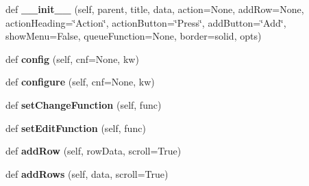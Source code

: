 \begin{DoxyCompactItemize}
\item 
\mbox{\label{class_python_01_g_u_i_1_1appjar_1_1_simple_table_a076b26a3bbfc6f50b1dfe77f1b02a424}} 
def {\bfseries \+\_\+\+\_\+init\+\_\+\+\_\+} (self, parent, title, data, action=None, add\+Row=None, action\+Heading=\char`\"{}Action\char`\"{}, action\+Button=\char`\"{}Press\char`\"{}, add\+Button=\char`\"{}Add\char`\"{}, show\+Menu=False, queue\+Function=None, border=\textquotesingle{}solid\textquotesingle{}, opts)
\item 
\mbox{\label{class_python_01_g_u_i_1_1appjar_1_1_simple_table_a82a0f732837d6f2b230479eb44bd77e9}} 
def {\bfseries config} (self, cnf=None, kw)
\item 
\mbox{\label{class_python_01_g_u_i_1_1appjar_1_1_simple_table_a1759cd08db52ddd149507e7ad619183a}} 
def {\bfseries configure} (self, cnf=None, kw)
\item 
\mbox{\label{class_python_01_g_u_i_1_1appjar_1_1_simple_table_a357191d29649e951d1c9ef607579c1ea}} 
def {\bfseries set\+Change\+Function} (self, func)
\item 
\mbox{\label{class_python_01_g_u_i_1_1appjar_1_1_simple_table_ab00d0e0b57c7e05cc299e492d85a5f12}} 
def {\bfseries set\+Edit\+Function} (self, func)
\item 
\mbox{\label{class_python_01_g_u_i_1_1appjar_1_1_simple_table_a02a97f82dcef8d11441c77d5f1d6e419}} 
def {\bfseries add\+Row} (self, row\+Data, scroll=True)
\item 
\mbox{\label{class_python_01_g_u_i_1_1appjar_1_1_simple_table_a59d7acf98073f8c53eccb585c2db9022}} 
def {\bfseries add\+Rows} (self, data, scroll=True)
\item 
\mbox{\label{class_python_01_g_u_i_1_1appjar_1_1_simple_table_ae9dc20eb7256de64a8f6a9a00a0d43d3}} 

\end{DoxyCompactItemize}
